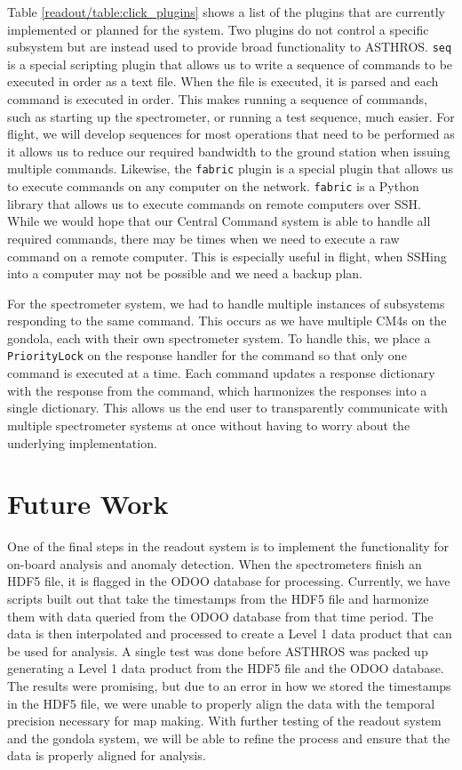 Table \ref{readout/table:click_plugins} shows a list of the plugins that are currently implemented or planned for the system.
Two plugins do not control a specific subsystem but are instead used to provide broad functionality to ASTHROS.
\texttt{seq} is a special scripting plugin that allows us to write a sequence of commands to be executed in order as a text file. 
When the file is executed, it is parsed and each command is executed in order.
This makes running a sequence of commands, such as starting up the spectrometer, or running a test sequence, much easier.
For flight, we will develop sequences for most operations that need to be performed as it allows us to reduce our required bandwidth to the ground station when issuing multiple commands. 
Likewise, the \texttt{fabric} plugin is a special plugin that allows us to execute commands on any computer on the network.
\texttt{fabric} is a Python library that allows us to execute commands on remote computers over SSH. 
While we would hope that our Central Command system is able to handle all required commands, there may be times when we need to execute a raw command on a remote computer.
This is especially useful in flight, when SSHing into a computer may not be possible and we need a backup plan.

For the spectrometer system, we had to handle multiple instances of subsystems responding to the same command.
This occurs as we have multiple CM4s on the gondola, each with their own spectrometer system.
To handle this, we place a \texttt{PriorityLock} on the response handler for the command so that only one command is executed at a time.
Each command updates a response dictionary with the response from the command, which harmonizes the responses into a single dictionary.
This allows us the end user to transparently communicate with multiple spectrometer systems at once without having to worry about the underlying implementation.

\section{Future Work}
\label{readout/section:future}
One of the final steps in the readout system is to implement the functionality for on-board analysis and anomaly detection.
When the spectrometers finish an HDF5 file, it is flagged in the ODOO database for processing.
Currently, we have scripts built out that take the timestamps from the HDF5 file and harmonize them with data queried from the ODOO database from that time period.
The data is then interpolated and processed to create a Level 1 data product that can be used for analysis.
A single test was done before ASTHROS was packed up generating a Level 1 data product from the HDF5 file and the ODOO database.
The results were promising, but due to an error in how we stored the timestamps in the HDF5 file, we were unable to properly align the data with the temporal precision necessary for map making.
With further testing of the readout system and the gondola system, we will be able to refine the process and ensure that the data is properly aligned for analysis.

